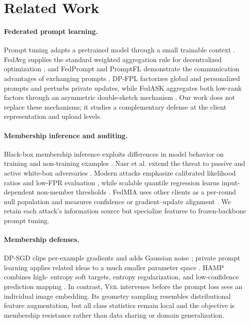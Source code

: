 \documentclass[letterpaper]{article}
\newcommand{\method}{\textsc{Veil}}
\begin{document}
\section{Related Work}

\paragraph{Federated prompt learning.}
Prompt tuning adapts a pretrained model through a small trainable context
\citep{lester2021prompt,zhou2022coop}.  FedAvg supplies the standard weighted
aggregation rule for decentralized optimization \citep{mcmahan2017fedavg}, and
FedPrompt and PromptFL demonstrate the communication advantages of exchanging
prompts \citep{zhao2023fedprompt,guo2024promptfl}.  DP-FPL factorizes global and personalized prompts
and perturbs private updates, while FedASK aggregates both low-rank factors
through an asymmetric double-sketch mechanism
\citep{dpfpl2025,fedask2025}.  Our work does not replace these mechanisms; it
studies a complementary defense at the client representation and upload levels.

\paragraph{Membership inference and auditing.}
Black-box membership inference exploits differences in model behavior on
training and non-training examples \citep{shokri2017membership}.  Nasr et al.
extend the threat to passive and active white-box adversaries
\citep{nasr2019comprehensive}.  Modern attacks emphasize calibrated likelihood
ratios and low-FPR evaluation \citep{carlini2022membership,zarifzadeh2024rmia},
while scalable quantile regression learns input-dependent non-member thresholds
\citep{bertran2023quantile}.  FedMIA uses other clients as a per-round null
population and measures confidence or gradient--update alignment
\citep{zhu2025fedmia}.  We retain each attack's information source but specialize
features to frozen-backbone prompt tuning.

\paragraph{Membership defenses.}
DP-SGD clips per-example gradients and adds Gaussian noise
\citep{abadi2016dpsgd}; private prompt learning applies related ideas to a much
smaller parameter space \citep{duan2023privateprompt}.  HAMP combines high-
entropy soft targets, entropy regularization, and low-confidence prediction
mapping \citep{chen2024hamp}.  In contrast, \method{} intervenes before the
prompt loss sees an individual image embedding.  Its geometry sampling resembles
distributional feature augmentation, but all class statistics remain local and
the objective is membership resistance rather than data sharing or domain
generalization.
\end{document}
